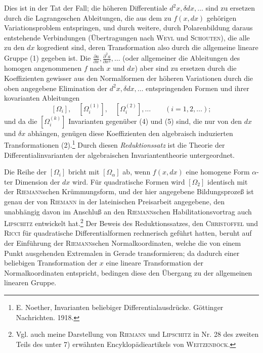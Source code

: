 Dies ist in der Tat der Fall; die höheren Differentiale $d^2x,\delta d x,\ldots$ sind zu ersetzen durch die Lagrangeschen Ableitungen, die aus dem zu $f(x,d x)$ gehörigen Variationsproblem entspringen, und durch weitere, durch Polarenbildung daraus entstehende Verbindungen (Übertragungen nach \textsc{Weyl} und \textsc{Schouten}), die alle zu den $d x$ kogredient sind, deren Transformation also durch die allgemeine lineare Gruppe (1) gegeben ist. Die $\frac{\partial a}{\partial x},\frac{\partial^2a}{\partial x^2},\ldots$ (oder allgemeiner die Ableitungen des homogen angenommenen $f$ nach $x$ und $d x$) aber sind zu ersetzen durch die Koeffizienten gewisser aus den \glqq{}Normalformen der höheren Variationen\grqq{} durch die oben angegebene Elimination der $d^2x,\delta d x,\ldots$ entspringenden Formen und ihrer \glqq{}kovarianten Ableitungen\grqq{}
\[
 [\Omega_i],\quad [\Omega_i^{(1)}],\quad [\Omega_i^{(2)}],\ldots\qquad (i=1,2,\ldots);
\]
und da die $[\Omega_i^{(k)}]$ Invarianten gegenüber (4) und (5) sind, die nur von den $d x$ und $\delta x$ abhängen, genügen diese Koeffizienten den algebraisch induzierten Transformationen (2).\footnote{E. Noether, Invarianten beliebiger Differentialausdrücke. Göttinger Nachrichten. 1918.} Durch diesen \emph{Reduktionssatz} ist die Theorie der Differentialinvarianten der algebraischen Invariantentheorie untergeordnet.

Die Reihe der $[\Omega_i]$ bricht mit $[\Omega_\alpha]$ ab, wenn $f(x,d x)$ eine homogene Form $\alpha$-ter Dimension der $d x$ wird. Für quadratische Formen wird $[\Omega_2]$ identisch mit der \textsc{Riemann}schen Krümmungsform, und der hier angegebene Bildungsprozeß ist genau der von \textsc{Riemann} in der lateinischen Preisarbeit angegebene, den unabhängig davon im Anschluß an den \textsc{Riemann}schen Habilitationsvortrag auch \textsc{Lipschitz} entwickelt hat.\footnote{Vgl. auch meine Darstellung von \textsc{Riemann} und \textsc{Lipschitz} in Nr. 28 des zweiten Teils des unter 7) erwähnten Encyklopädieartikels von \textsc{Weitzenböck}.} Der Beweis des Reduktionssatzes, den \textsc{Christoffel} und \textsc{Ricci} für quadratische Differentialformen rechnerisch geführt hatten, beruht auf der Einführung der \glqq{}\textsc{Riemann}schen Normalkoordinaten\grqq{}, welche die von einem Punkt ausgehenden Extremalen in Gerade transformieren; da dadurch einer beliebigen Transformation der $x$ eine lineare Transformation der Normalkoordinaten entspricht, bedingen diese den Übergang zu der allgemeinen linearen Gruppe.

